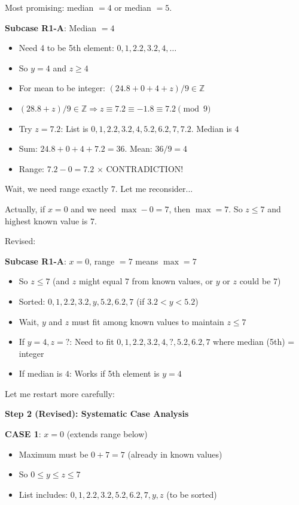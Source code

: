 \documentclass[11pt]{article}
\begin{document}
\begin{solutionbox}
Most promising: median $= 4$ or median $= 5$.

\textbf{Subcase R1-A}: Median $= 4$
\begin{itemize}
    \item Need 4 to be 5th element: $0, 1, 2.2, 3.2, 4, \ldots$
    \item So $y = 4$ and $z \geq 4$
    \item For mean to be integer: $(24.8 + 0 + 4 + z)/9 \in \mathbb{Z}$
    \item $(28.8 + z)/9 \in \mathbb{Z} \Rightarrow z \equiv 7.2 \equiv -1.8 \equiv 7.2 \pmod{9}$
    \item Try $z = 7.2$: List is $0, 1, 2.2, 3.2, 4, 5.2, 6.2, 7, 7.2$. Median is $4$ \checkmark
    \item Sum: $24.8 + 0 + 4 + 7.2 = 36$. Mean: $36/9 = 4$ \checkmark
    \item Range: $7.2 - 0 = 7.2$ $\times$ CONTRADICTION!
\end{itemize}

Wait, we need range exactly $7$. Let me reconsider...

Actually, if $x = 0$ and we need $\max - 0 = 7$, then $\max = 7$. So $z \leq 7$ and highest known value is $7$.

Revised:

\textbf{Subcase R1-A}: $x = 0$, range $= 7$ means $\max = 7$
\begin{itemize}
    \item So $z \leq 7$ (and $z$ might equal $7$ from known values, or $y$ or $z$ could be $7$)
    \item Sorted: $0, 1, 2.2, 3.2, y, 5.2, 6.2, 7$ (if $3.2 < y < 5.2$)
    \item Wait, $y$ and $z$ must fit among known values to maintain $z \leq 7$
    \item If $y = 4, z = ?$: Need to fit $0, 1, 2.2, 3.2, 4, ?, 5.2, 6.2, 7$ where median (5th) = integer
    \item If median is $4$: Works if 5th element is $y = 4$
\end{itemize}

Let me restart more carefully:

\textbf{Step 2 (Revised): Systematic Case Analysis}

\textbf{CASE 1}: $x = 0$ (extends range below)
\begin{itemize}
    \item Maximum must be $0 + 7 = 7$ (already in known values)
    \item So $0 \leq y \leq z \leq 7$
    \item List includes: $0, 1, 2.2, 3.2, 5.2, 6.2, 7, y, z$ (to be sorted)
\end{itemize}


\end{solutionbox}
\end{document}
